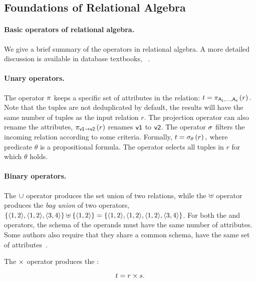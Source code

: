 \subsection{Foundations of Relational Algebra}

\paragraph{Basic operators of relational algebra.} We give a brief summary of the operators in relational algebra. A more detailed discussion is available in database textbooks, \eg~\cite{DBLP:books/daglib/0006733}.

\paragraph{Unary operators.} The \projectiontext operator $\pi$ keeps a specific set of attributes in the relation: $ t = \pi_{\mathsf{A_1, \ldots, A_n}} \left(r\right).$ Note that the tuples are not deduplicated by default, \ie the results will have the same number of tuples as the input relation $r$. The projection operator can also rename the attributes, \eg $\pi_{\mathsf{v1 \rightarrow v2}} \left(r\right)$ renames $\mathsf{v1}$ to $\mathsf{v2}$.
The \selectiontext operator $\sigma$ filters the incoming relation according to some criteria. Formally,
$ t = \sigma_{\mathsf{\theta}} \left(r\right), $
where predicate $\theta$ is a propositional formula. The operator selects all tuples in $r$ for which $\theta$ holds.

\paragraph{Binary operators.} The $\cup$ operator produces the set union of two relations, while the $\uplus$ operator produces the \emph{bag union} of two operators, \eg $\{\langle 1, 2 \rangle, \langle 1, 2 \rangle, \langle 3, 4 \rangle\} \uplus \{\langle 1, 2 \rangle\} = \{\langle 1, 2 \rangle, \langle 1, 2 \rangle, \langle 1, 2 \rangle, \langle 3, 4 \rangle\}$. For both the \uniontext and \baguniontext operators, the schema of the operands must have the same number of attributes. Some authors also require that they share a common schema, \ie have the same set of attributes~\cite{DBLP:books/daglib/0020812}.

The $\times$ operator produces the \cartesianproducttext:

$$ t = r \times s.$$

